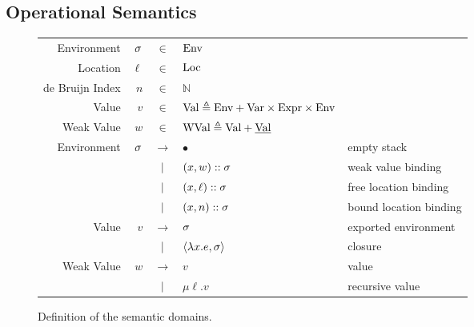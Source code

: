 \documentclass{article}
\begin{document}
\subsection{Operational Semantics}
\begin{figure}[h!]
	\centering
	\small
	\begin{tabular}{rrcll}
		Environment     & $\sigma$ & $\in$         & $\text{Env}$                                                                         \\
		Location        & $\ell$ & $\in$         & $\text{Loc}$                                                                         \\
		de Bruijn Index & $n$    & $\in$         & $\mathbb{N}$                                                                   \\
		Value           & $v$    & $\in$         & $\text{Val} \triangleq\text{Env}+\text{Var}\times\text{Expr}\times\text{Env}$                          \\
		Weak Value      & $w$    & $\in$         & $\text{WVal}\triangleq\text{Val}+\underline{\text{Val}}$                                      \\
		Environment     & $\sigma$ & $\rightarrow$ & $\bullet$                                             & empty stack            \\
		                &        & $|$       & $(x,w):: \sigma$                                     & weak value binding     \\
		                &        & $|$       & $(x,\ell)::\sigma$                                   & free location binding  \\
		                &        & $|$       & $(x,n)::\sigma$                                      & bound location binding \\
		Value           & $v$    & $\rightarrow$ & $\sigma$                                                & exported environment   \\
		                &        & $|$       & $\langle \lambda x.e, \sigma \rangle$                   & closure                \\
		Weak Value      & $w$    & $\rightarrow$ & $v$                                                   & value                  \\
		                &        & $|$       & $\mu\ell.v$                                           & recursive value
	\end{tabular}
	\caption{Definition of the semantic domains.}
	\label{fig:domain}
\end{figure}
\end{document}
